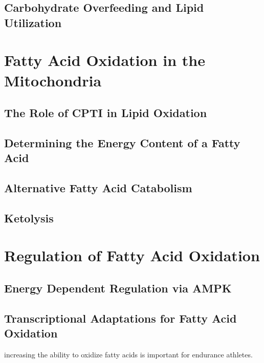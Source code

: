 \documentclass{tufte-handout}
\begin{document}
\subsection{Carbohydrate Overfeeding and Lipid Utilization}
\section{Fatty Acid Oxidation in the Mitochondria}
\subsection{The Role of CPTI in Lipid Oxidation}
\subsection{Determining the Energy Content of a Fatty Acid}
\subsection{Alternative Fatty Acid Catabolism}
\subsection{Ketolysis}
\section{Regulation of Fatty Acid Oxidation}
\subsection{Energy Dependent Regulation via AMPK}
\subsection{Transcriptional Adaptations for Fatty Acid Oxidation}
 increasing the ability to oxidize fatty acids is important for endurance athletes.






\end{document}
